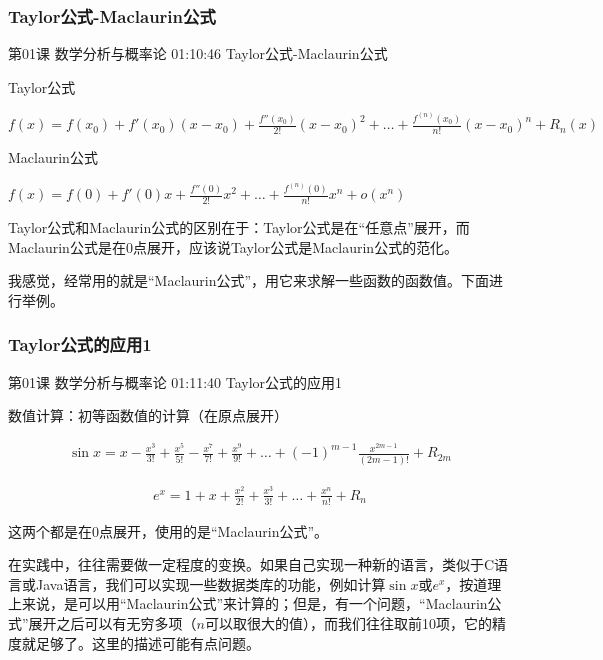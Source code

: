 \documentclass[UTF8]{ctexart}
\begin{document}
\subsubsection{Taylor公式-Maclaurin公式}

第01课 数学分析与概率论 01:10:46 Taylor公式-Maclaurin公式

Taylor公式

$f(x)=f(x_{0})+f'(x_{0})(x-x_{0})+\frac{f''(x_{0})}{2!}(x-x_{0})^{2}+\dots+\frac{f^{(n)}(x_{0})}{n!}(x-x_{0})^{n}+R_{n}(x)$

Maclaurin公式

$f(x)=f(0)+f'(0)x+\frac{f''(0)}{2!}x^{2}+\dots+\frac{f^{(n)}(0)}{n!}x^{n}+o(x^{n})$

Taylor公式和Maclaurin公式的区别在于：Taylor公式是在“任意点”展开，而Maclaurin公式是在$0$点展开，应该说Taylor公式是Maclaurin公式的范化。

我感觉，经常用的就是“Maclaurin公式”，用它来求解一些函数的函数值。下面进行举例。

\subsubsection{Taylor公式的应用1}

第01课 数学分析与概率论 01:11:40 Taylor公式的应用1

数值计算：初等函数值的计算（在原点展开）

\begin{equation}
\begin{aligned}
\sin x = x - \frac{x^{3}}{3!} + \frac{x^{5}}{5!}  - \frac{x^{7}}{7!} + \frac{x^{9}}{9!} + \dots
+ (-1)^{m-1} \frac{x^{2m-1}}{(2m-1)!} + R_{2m}
\end{aligned}
\end{equation}

\begin{equation}
\begin{aligned}
e^{x} = 1 + x + \frac{x^{2}}{2!} +  \frac{x^{3}}{3!} + \dots +  \frac{x^{n}}{n!} + R_{n}
\end{aligned}
\end{equation}

这两个都是在$0$点展开，使用的是“Maclaurin公式”。

在实践中，往往需要做一定程度的变换。如果自己实现一种新的语言，类似于C语言或Java语言，我们可以实现一些数据类库的功能，例如计算$\sin x$或$e^{x}$，按道理上来说，是可以用“Maclaurin公式”来计算的；但是，有一个问题，“Maclaurin公式”展开之后可以有无穷多项（$n$可以取很大的值），而我们往往取前10项，它的精度就足够了。这里的描述可能有点问题。
\end{document}
